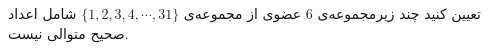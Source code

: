    \p 
تعیین کنید چند زیرمجموعه‌ی
$6$
عضوی از مجموعه‌ی
$\{1, 2, 3, 4, \cdots, 31\}$
شامل اعداد صحیح متوالی نیست.